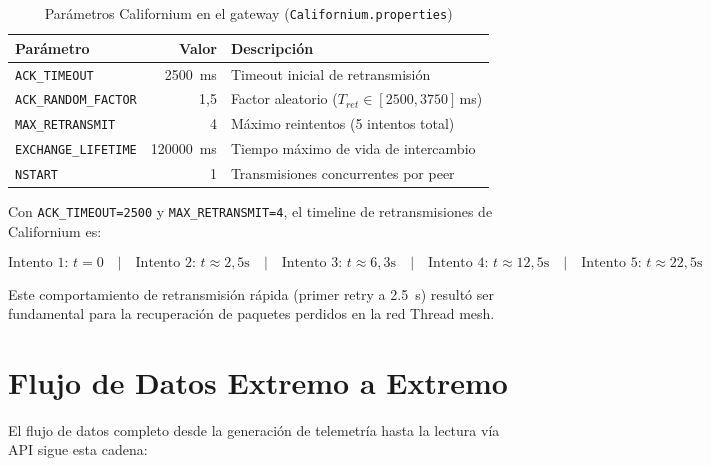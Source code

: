 \documentclass[11pt,a4paper]{article}
\begin{document}
\begin{table}[H]
\centering
\caption{Parámetros Californium en el gateway (\texttt{Californium.properties})}
\label{tab:californium}
\begin{tabular}{l r l}
\toprule
\textbf{Parámetro} & \textbf{Valor} & \textbf{Descripción} \\
\midrule
\texttt{ACK\_TIMEOUT} & \SI{2500}{\milli\second} & Timeout inicial de retransmisión \\
\texttt{ACK\_RANDOM\_FACTOR} & 1,5 & Factor aleatorio ($T_{ret} \in [2500, 3750]$\,ms) \\
\texttt{MAX\_RETRANSMIT} & 4 & Máximo reintentos (5 intentos total) \\
\texttt{EXCHANGE\_LIFETIME} & \SI{120000}{\milli\second} & Tiempo máximo de vida de intercambio \\
\texttt{NSTART} & 1 & Transmisiones concurrentes por peer \\
\bottomrule
\end{tabular}
\end{table}

\noindent Con \texttt{ACK\_TIMEOUT=2500} y \texttt{MAX\_RETRANSMIT=4}, el timeline de retransmisiones de Californium es:

\begin{equation}
\text{Intento 1: } t=0 \quad|\quad \text{Intento 2: } t \approx 2{,}5\text{s} \quad|\quad \text{Intento 3: } t \approx 6{,}3\text{s} \quad|\quad \text{Intento 4: } t \approx 12{,}5\text{s} \quad|\quad \text{Intento 5: } t \approx 22{,}5\text{s}
\end{equation}

\noindent Este comportamiento de retransmisión rápida (primer retry a \SI{2.5}{\second}) resultó ser fundamental para la recuperación de paquetes perdidos en la red Thread mesh.

\section{Flujo de Datos Extremo a Extremo}

El flujo de datos completo desde la generación de telemetría hasta la lectura vía API sigue esta cadena:
\end{document}
